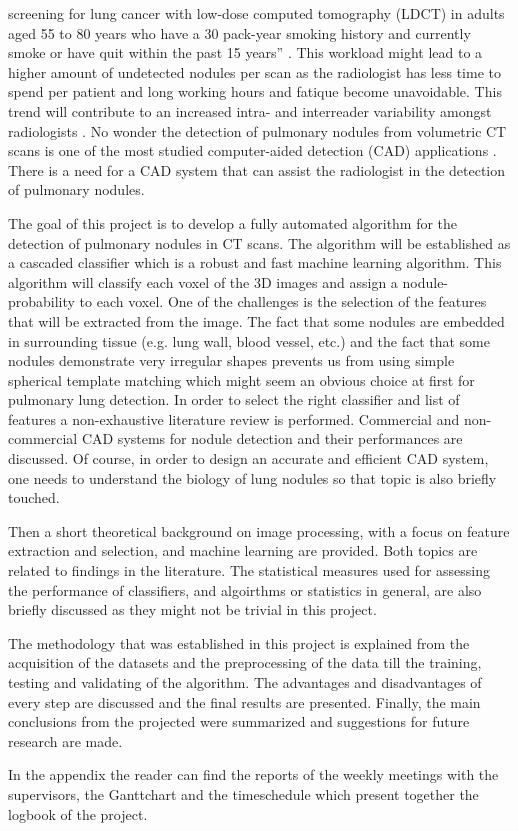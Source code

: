 screening for lung cancer with low-dose computed tomography (LDCT) in adults
aged 55 to 80 years who have a 30 pack-year smoking history and currently smoke
or have quit within the past 15 years'' \cite{ups}. This workload might lead to
a higher amount of undetected nodules per scan as the radiologist has
less time to spend per patient and long working hours and fatique become
unavoidable. This trend will contribute to an increased intra- and
interreader variability amongst radiologists \cite{armato, hens}. No wonder the
detection of pulmonary nodules from volumetric CT scans is one of the most studied computer-aided detection (CAD) applications
\cite{sluimer}. There is a need for a CAD system that can assist the radiologist
in the detection of pulmonary nodules.

The goal of this project is to develop a fully automated algorithm for the
detection of pulmonary nodules in CT scans. The algorithm will be established as
a cascaded classifier which is a robust and fast machine learning algorithm.
This algorithm will classify each voxel of the 3D images and assign a
nodule-probability to each voxel. One of the challenges is the selection of the
features that will be extracted from the image. The fact that some nodules are
embedded in surrounding tissue (e.g.
lung wall, blood vessel, etc.) and the fact that some nodules demonstrate very
irregular shapes prevents us from using simple spherical template matching which
might seem an obvious choice at first for pulmonary lung detection. In order to
select the right classifier and list of features a non-exhaustive literature
review is performed. Commercial and non-commercial CAD systems for nodule
detection and their performances are discussed. Of course, in order to design an
accurate and efficient CAD system, one needs to understand the biology of lung
nodules so that topic is also briefly touched.

Then a short theoretical background on image processing, with a focus on feature
extraction and selection, and machine learning are provided. Both topics
are related to findings in the literature. The statistical measures used for
assessing the performance of classifiers, and algoirthms or statistics in
general, are also briefly discussed as they might not be trivial in this
project.

The methodology that was established in this project is explained from the
acquisition of the datasets and the preprocessing of the data till the training,
testing and validating of the algorithm. The advantages and disadvantages of
every step are discussed and the final results are presented. Finally, the main
conclusions from the projected were summarized and suggestions for future
research are made.

In the appendix the reader can find the reports of the weekly meetings with the
supervisors, the Ganttchart and the timeschedule which present together the
logbook of the project.







